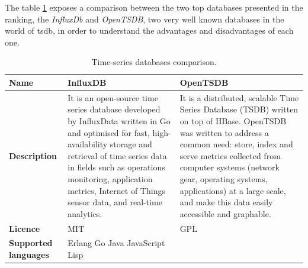 The table \ref{table:time_series_databases_comparison} exposes a comparison between the two top databases presented in the ranking, the \textit{InfluxDb} and \textit{OpenTSDB}, two very well known databases in the world of \gls{tsdb}, in order to understand the advantages and disadvantages of each one.

\begin{table}[H]
    \caption{Time-series databases comparison.}
    \label{table:time_series_databases_comparison}
    \centering
    \large
    \begin{tabularx}{\linewidth} {
        |>{\hsize=0.50\hsize}X|
        >{\hsize=1.25\hsize}X|
        >{\hsize=1.25\hsize}X| }
        \hline
        \textbf{Name}
         & InfluxDB \cite{influxdb}
         & OpenTSDB \cite{opentsdb}                                                                                                                                                                                                                                                                                               \\ \hline
        \textbf{Description}
         & It is an open-source time series database developed by InfluxData written in Go and optimised for fast, high-availability storage and retrieval of time series data in fields such as operations monitoring, application metrics, Internet of Things sensor data, and real-time analytics.
         & It is a distributed, scalable Time Series Database (TSDB) written on top of HBase. OpenTSDB was written to address a common need: store, index and serve metrics collected from computer systems (network gear, operating systems, applications) at a large scale, and make this data easily accessible and graphable. \\ \hline
        \textbf{Licence}
         & MIT
         & GPL                                                                                                                                                                                                                                                                                                                    \\ \hline
        \textbf{Supported languages}
         & Erlang \newline
        Go \newline
        Java \newline
        JavaScript \newline
        Lisp \newline

\end{tabularx}
\end{table}
